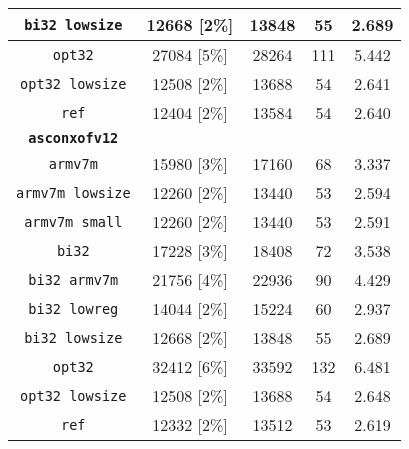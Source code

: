 \begin{table}[h]
\begin{adjustbox}{width=205pt}
\begin{tabular}{|c|c|c|c|c|}
        \hline
        \texttt{bi32 lowsize} & 12668 [2\%] & 13848 & 55 & 2.689 \\
        \hline
        \texttt{opt32} & 27084 [5\%] & 28264 & 111 & 5.442 \\
        \hline
        \texttt{opt32 lowsize} & 12508 [2\%] & 13688 & 54 & 2.641 \\
        \hline
        \texttt{ref} & 12404 [2\%] & 13584 & 54 & 2.640 \\
        \hline
        \texttt{\textbf{asconxofv12}} & & & & \\
        \hline
        \texttt{armv7m} & 15980 [3\%] & 17160 & 68 & 3.337 \\
        \hline
        \texttt{armv7m lowsize} & 12260 [2\%] & 13440 & 53 & 2.594 \\
        \hline
        \texttt{armv7m small} & 12260 [2\%] & 13440 & 53 & 2.591 \\
        \hline
        \texttt{bi32} & 17228 [3\%] & 18408 & 72 & 3.538 \\
        \hline
        \texttt{bi32 armv7m} & 21756 [4\%] & 22936 & 90 & 4.429 \\
        \hline
        \texttt{bi32 lowreg} & 14044 [2\%] & 15224 & 60 & 2.937 \\
        \hline
        \texttt{bi32 lowsize} & 12668 [2\%] & 13848 & 55 & 2.689 \\
        \hline
        \texttt{opt32} & 32412 [6\%] & 33592 & 132 & 6.481 \\
        \hline
        \texttt{opt32 lowsize} & 12508 [2\%] & 13688 & 54 & 2.648 \\
        \hline
        \texttt{ref} & 12332 [2\%] & 13512 & 53 & 2.619 \\
        \hline
    \end{tabular}
    \end{adjustbox}
\end{table}

